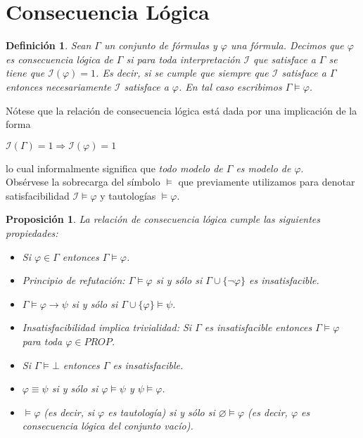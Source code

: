 \documentclass[letterpaper,11pt]{article}
\newtheorem{define}{Definición}[]
\newtheorem{prop}{Proposición}[]
\begin{document}
    \section{Consecuencia Lógica}
    \begin{define}
        Sean $\Gamma$ un conjunto de fórmulas y $\varphi$ una fórmula. Decimos
        que $\varphi$ es consecuencia lógica de $\Gamma$ si para toda 
        interpretación $\mathcal{I}$ que satisface a $\Gamma$ se tiene que 
        $\mathcal{I}(\varphi) = 1$. Es decir, si se cumple que siempre que 
        $\mathcal{I}$ satisface a $\Gamma$ entonces necesariamente 
        $\mathcal{I}$ satisface a $\varphi$. En tal caso escribimos 
        $\Gamma \models \varphi$.
    \end{define}

    \justify
    Nótese que la relación de consecuencia lógica está dada por una implicación
    de la forma 
    \begin{center}
        $\mathcal{I}(\Gamma) = 1 \Rightarrow \mathcal{I}(\varphi) = 1$
    \end{center}

    \justify
    lo cual informalmente significa que \textit{todo modelo de $\Gamma$ es 
    modelo de $\varphi$}. \\
    Obsérvese la sobrecarga del símbolo $\models$ que previamente utilizamos
    para denotar satisfacibilidad $\mathcal{I} \models \varphi$ y tautologías
    $\models \varphi$.

    \begin{prop}
        La relación de consecuencia lógica cumple las siguientes propiedades:
        \begin{itemize}
            \item Si $\varphi \in \Gamma$ entonces $\Gamma \models \varphi$.
            \item Principio de refutación: $\Gamma \models \varphi$ si y 
            sólo si $\Gamma \cup \{ \neg \varphi\}$ es insatisfacible.
            \item $\Gamma \models \varphi \rightarrow \psi$ si y sólo si 
            $\Gamma \cup \{ \varphi \} \models \psi$.
            \item Insatisfacibilidad implica trivialidad: Si $\Gamma$ es 
            insatisfacible entonces $\Gamma \models \varphi$ para toda 
            $\varphi \in PROP$.
            \item Si $\Gamma \models \bot$ entonces $\Gamma$ es insatisfacible.
            \item $\varphi \equiv \psi$ si y sólo si $\varphi \models \psi$ y 
            $\psi \models \varphi$.
            \item $\models \varphi$ (es decir, si $\varphi$ es tautología)
            si y sólo si $\varnothing \models \varphi$ (es decir, $\varphi$
            es consecuencia lógica del conjunto vacío).
        \end{itemize}
    \end{prop}
\end{document}
